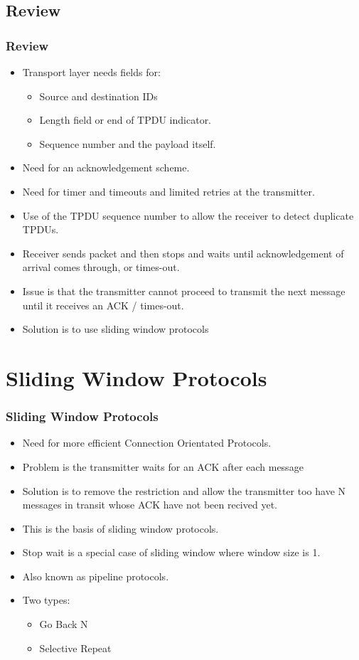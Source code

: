 \documentclass{beamer}
\begin{document}
\subsection{Review}
\begin{frame}
\frametitle{Review}
\begin{itemize}
\item Transport layer needs fields for:
\begin{itemize}
\item Source and destination IDs
\item Length field or end of TPDU indicator.
\item Sequence number and the payload itself.
\end{itemize}
\item Need for an acknowledgement scheme.
\item Need for timer and timeouts and limited retries at the transmitter.
\item Use of the TPDU sequence number to allow the receiver to detect duplicate TPDUs.
\item Receiver sends packet and then stops and waits until acknowledgement of arrival comes through, or times-out.
\item Issue is that the transmitter cannot proceed to transmit the next message until it receives an ACK / times-out.
\item Solution is to use sliding window protocols
\end{itemize}
\end{frame}
\section{Sliding Window Protocols}
\begin{frame}
\frametitle{Sliding Window Protocols}
\begin{itemize}
\item Need for more efficient Connection Orientated Protocols.
\item Problem is the transmitter waits for an ACK after each message
\item Solution is to remove the restriction and allow the transmitter too have N messages in transit whose ACK have not been recived yet.
\item This is the basis of sliding window protocols.
\item Stop wait is a special case of sliding window where window size is 1.
\item Also known as {\color{red}pipeline protocols}.
\item Two types:
\begin{itemize}
\item Go Back N
\item Selective Repeat
\end{itemize}
\end{itemize}
\end{frame}
\end{document}
